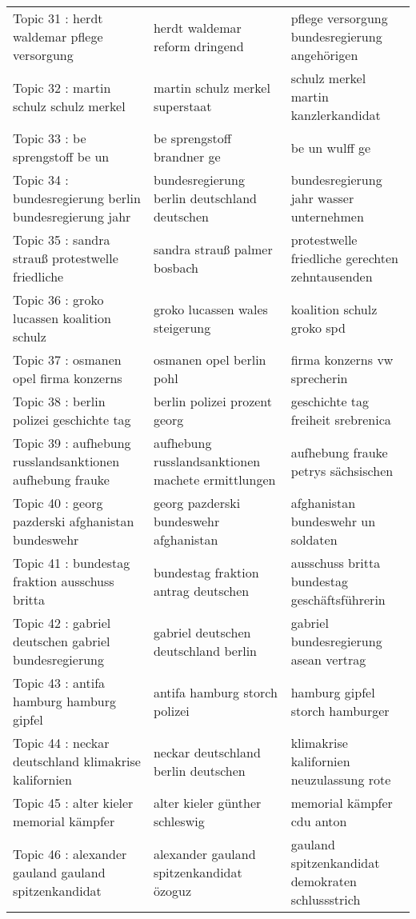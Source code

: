 \begin{table}[ht]
\begin{tabular}{lll}
  Topic 31 : herdt waldemar pflege versorgung & herdt waldemar reform dringend & pflege versorgung bundesregierung angehörigen \\ 
  Topic 32 : martin schulz schulz merkel & martin schulz merkel superstaat & schulz merkel martin kanzlerkandidat \\ 
  Topic 33 : be sprengstoff be un & be sprengstoff brandner ge & be un wulff ge \\ 
  Topic 34 : bundesregierung berlin bundesregierung jahr & bundesregierung berlin deutschland deutschen & bundesregierung jahr wasser unternehmen \\ 
  Topic 35 : sandra strauß protestwelle friedliche & sandra strauß palmer bosbach & protestwelle friedliche gerechten zehntausenden \\ 
  Topic 36 : groko lucassen koalition schulz & groko lucassen wales steigerung & koalition schulz groko spd \\ 
  Topic 37 : osmanen opel firma konzerns & osmanen opel berlin pohl & firma konzerns vw sprecherin \\ 
  Topic 38 : berlin polizei geschichte tag & berlin polizei prozent georg & geschichte tag freiheit srebrenica \\ 
  Topic 39 : aufhebung russlandsanktionen aufhebung frauke & aufhebung russlandsanktionen machete ermittlungen & aufhebung frauke petrys sächsischen \\ 
  Topic 40 : georg pazderski afghanistan bundeswehr & georg pazderski bundeswehr afghanistan & afghanistan bundeswehr un soldaten \\ 
  Topic 41 : bundestag fraktion ausschuss britta & bundestag fraktion antrag deutschen & ausschuss britta bundestag geschäftsführerin \\ 
  Topic 42 : gabriel deutschen gabriel bundesregierung & gabriel deutschen deutschland berlin & gabriel bundesregierung asean vertrag \\ 
  Topic 43 : antifa hamburg hamburg gipfel & antifa hamburg storch polizei & hamburg gipfel storch hamburger \\ 
  Topic 44 : neckar deutschland klimakrise kalifornien & neckar deutschland berlin deutschen & klimakrise kalifornien neuzulassung rote \\ 
  Topic 45 : alter kieler memorial kämpfer & alter kieler günther schleswig & memorial kämpfer cdu anton \\ 
  Topic 46 : alexander gauland gauland spitzenkandidat & alexander gauland spitzenkandidat özoguz & gauland spitzenkandidat demokraten schlussstrich \\ 

\end{tabular}
\end{table}
